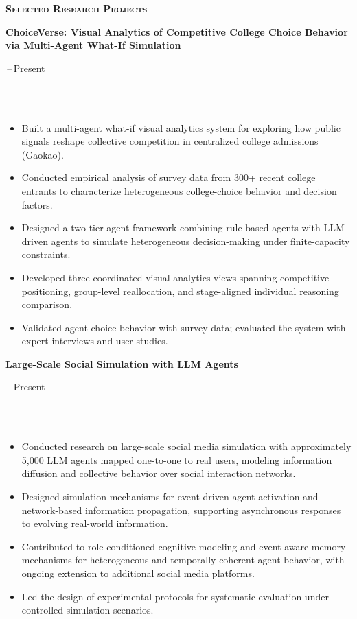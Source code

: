 \documentclass[10pt,a4paper]{article}
\newcommand{\bodyfont}{\fontsize{10.4pt}{13.35pt}\selectfont}
\newcommand{\datefont}{\fontsize{9.6pt}{12.05pt}\selectfont\color{CVGray}}
\newcommand{\cvsection}[1]{%
  \Needspace{2.6\baselineskip}%
  \vspace{9pt}%
  {\fontsize{11.6pt}{13.8pt}\selectfont\bfseries\scshape #1}\par
  \vspace{\dimexpr-\baselineskip+2.8pt\relax}%
  \noindent{\color{CVRule}\rule{\textwidth}{0.32pt}}\par
  \vspace{5pt}%
}
\newcommand{\pairedline}[4]{%
  \noindent
  {\bodyfont\parbox[t]{\dimexpr\textwidth-44mm\relax}{\raggedright #1}}%
  \hfill
  {\datefont\parbox[t]{42mm}{\raggedleft #2}}%
  \par
  \ifx\\#3\\\else
    \vspace{0.15pt}%
    \noindent
    {\bodyfont\parbox[t]{\dimexpr\textwidth-44mm\relax}{\raggedright #3}}%
    \hfill
    {\datefont\parbox[t]{42mm}{\raggedleft #4}}%
    \par
  \fi
}
\newcommand{\entryline}[2]{%
  \pairedline{{\bfseries #1}}{#2}{}{}%
}
\newcommand{\projectentry}[2]{%
  \entryline{#1}{#2}%
}
\newenvironment{cvitems}{%
  \begin{itemize}[leftmargin=1.22em,labelsep=0.42em,itemsep=2.35pt,topsep=0.15pt,parsep=0pt,partopsep=0pt]
  \bodyfont
}{\end{itemize}}
\begin{document}
\cvsection{Selected Research Projects}
\projectentry{ChoiceVerse: Visual Analytics of Competitive College Choice Behavior via Multi-Agent What-If Simulation}{2025.09\,--\,Present}
\begin{cvitems}
  \item Built a multi-agent what-if visual analytics system for exploring how public signals reshape collective competition in centralized college admissions (Gaokao).
  \item Conducted empirical analysis of survey data from 300+ recent college entrants to characterize heterogeneous college-choice behavior and decision factors.
  \item Designed a two-tier agent framework combining rule-based agents with LLM-driven agents to simulate heterogeneous decision-making under finite-capacity constraints.
  \item Developed three coordinated visual analytics views spanning competitive positioning, group-level reallocation, and stage-aligned individual reasoning comparison.
  \item Validated agent choice behavior with survey data; evaluated the system with expert interviews and user studies.
\end{cvitems}
\vspace{3.4pt}
\projectentry{Large-Scale Social Simulation with LLM Agents}{2025.09\,--\,Present}
\begin{cvitems}
  \item Conducted research on large-scale social media simulation with approximately 5,000 LLM agents mapped one-to-one to real users, modeling information diffusion and collective behavior over social interaction networks.
  \item Designed simulation mechanisms for event-driven agent activation and network-based information propagation, supporting asynchronous responses to evolving real-world information.
  \item Contributed to role-conditioned cognitive modeling and event-aware memory mechanisms for heterogeneous and temporally coherent agent behavior, with ongoing extension to additional social media platforms.
  \item Led the design of experimental protocols for systematic evaluation under controlled simulation scenarios.
\end{cvitems}
\end{document}
